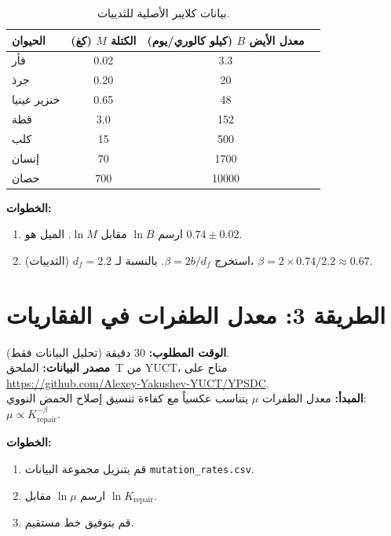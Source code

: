 \documentclass[12pt,a4paper]{article}
\begin{document}
	\begin{table}[H]
		\centering
		\caption{بيانات كلايبر الأصلية للثدييات.}
		\label{tab:kleiber}
		\begin{tabular}{l c c c}
			\toprule
			الحيوان  & الكتلة \(M\) (كغ) & معدل الأيض \(B\) (كيلو كالوري/يوم) \\
			\midrule
			فأر       & 0.02   & 3.3 \\
			جرذ         & 0.20   & 20 \\
			خنزير غينيا  & 0.65   & 48 \\
			قطة         & 3.0    & 152 \\
			كلب         & 15     & 500 \\
			إنسان       & 70     & 1700 \\
			حصان       & 700    & 10000 \\
			\bottomrule
		\end{tabular}
	\end{table}
	
	\textbf{الخطوات:}
	\begin{enumerate}[label=(\arabic*)]
		\item ارسم \(\ln B\) مقابل \(\ln M\). الميل هو \(0.74 \pm 0.02\).
		\item استخرج \(\beta = 2b / d_f\). بالنسبة لـ \(d_f = 2.2\) (الثدييات)، \(\beta = 2 \times 0.74 / 2.2 \approx 0.67\).
	\end{enumerate}
	
	\section{الطريقة 3: معدل الطفرات في الفقاريات}
	\label{sec:mutation}
	
	\textbf{الوقت المطلوب:} 30 دقيقة (تحليل البيانات فقط).\\
	\textbf{مصدر البيانات:} الملحق~T من YUCT، متاح على\\
	\url{https://github.com/Alexey-Yakushev-YUCT/YPSDC}.\\
	\textbf{المبدأ:} معدل الطفرات \(\mu\) يتناسب عكسياً مع كفاءة تنسيق إصلاح الحمض النووي: \(\mu \propto K_{\text{repair}}^{-\beta}\).
	
	\textbf{الخطوات:}
	\begin{enumerate}[label=(\arabic*)]
		\item قم بتنزيل مجموعة البيانات \texttt{mutation\_rates.csv}.
		\item ارسم \(\ln \mu\) مقابل \(\ln K_{\text{repair}}\).
		\item قم بتوفيق خط مستقيم.
	\end{enumerate}
	
\end{document}
